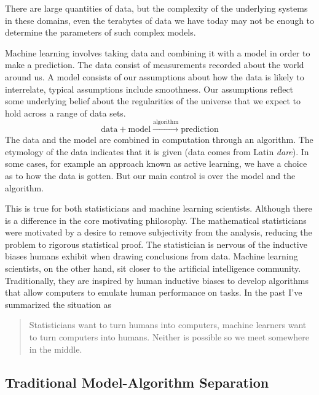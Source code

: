 \documentclass[a4paperpaper,]{article}
\begin{document}
There are large quantities of data, but the complexity of the underlying
systems in these domains, even the terabytes of data we have today may
not be enough to determine the parameters of such complex models.

Machine learning involves taking data and combining it with a model in
order to make a prediction. The data consist of measurements recorded
about the world around us. A model consists of our assumptions about how
the data is likely to interrelate, typical assumptions include
smoothness. Our assumptions reflect some underlying belief about the
regularities of the universe that we expect to hold across a range of
data sets. \[
\text{data} + \text{model} \stackrel{\text{algorithm}}{\rightarrow}  \text{prediction}
\] The data and the model are combined in computation through an
algorithm. The etymology of the data indicates that it is given (data
comes from Latin \emph{dare}). In some cases, for example an approach
known as active learning, we have a choice as to how the data is gotten.
But our main control is over the model and the algorithm.

This is true for both statisticians and machine learning scientists.
Although there is a difference in the core motivating philosophy. The
mathematical statisticians were motivated by a desire to remove
subjectivity from the analysis, reducing the problem to rigorous
statistical proof. The statistician is nervous of the inductive biases
humans exhibit when drawing conclusions from data. Machine learning
scientists, on the other hand, sit closer to the artificial intelligence
community. Traditionally, they are inspired by human inductive biases to
develop algorithms that allow computers to emulate human performance on
tasks. In the past I've summarized the situation as

\begin{quote}
Statisticians want to turn humans into computers, machine learners want
to turn computers into humans. Neither is possible so we meet somewhere
in the middle.
\end{quote}

\hypertarget{traditional-model-algorithm-separation}{%
\subsection{Traditional Model-Algorithm
Separation}\label{traditional-model-algorithm-separation}}
\end{document}
